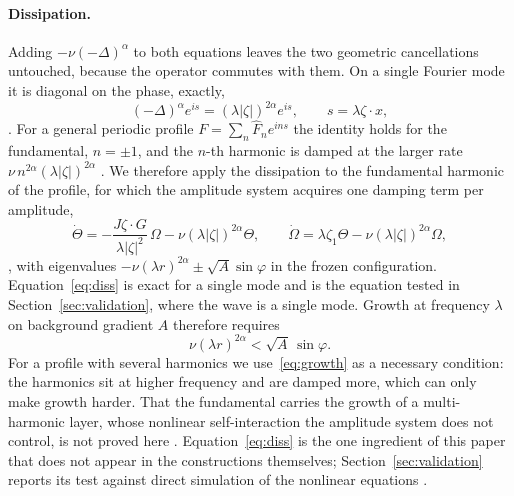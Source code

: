 \documentclass[11pt]{article}
\theoremstyle{remark}
\newcommand{\ev}[1]{\hspace{0.2em}{\small\textsf{[#1]}}}
\begin{document}
\paragraph{Dissipation.} Adding $-\nu(-\Delta)^{\alpha}$ to both equations leaves the two geometric
cancellations untouched, because the operator commutes with them. On a single Fourier mode it is
diagonal on the phase, exactly,
\begin{equation}\label{eq:mode}
(-\Delta)^{\alpha}e^{is}=(\lambda|\zeta|)^{2\alpha}e^{is},\qquad s=\lambda\zeta\cdot x ,
\end{equation}
\ev{D}. For a general periodic profile $F=\sum_{n}\hat F_{n}e^{ins}$ the identity holds for the
fundamental, $n=\pm1$, and the $n$-th harmonic is damped at the larger rate
$\nu\,n^{2\alpha}(\lambda|\zeta|)^{2\alpha}$ \ev{D}. We therefore apply the dissipation to the
fundamental harmonic of the profile, for which the amplitude system acquires one damping term per
amplitude,
\begin{equation}\label{eq:diss}
\dot\Theta=-\frac{J\zeta\cdot G}{\lambda|\zeta|^{2}}\,\Omega-\nu(\lambda|\zeta|)^{2\alpha}\Theta,
\qquad
\dot\Omega=\lambda\zeta_{1}\Theta-\nu(\lambda|\zeta|)^{2\alpha}\Omega ,
\end{equation}
\ev{D}, with eigenvalues $-\nu(\lambda r)^{2\alpha}\pm\sqrt A\sin\varphi$ in the frozen configuration.
Equation~\eqref{eq:diss} is exact for a single mode and is the equation tested in
Section~\ref{sec:validation}, where the wave is a single mode. Growth at frequency $\lambda$ on
background gradient $A$ therefore requires
\begin{equation}\label{eq:growth}
\nu(\lambda r)^{2\alpha}<\sqrt A\,\sin\varphi .
\end{equation}
For a profile with several harmonics we use~\eqref{eq:growth} as a necessary condition: the
harmonics sit at higher frequency and are damped more, which can only make growth harder. That the
fundamental carries the growth of a multi-harmonic layer, whose nonlinear self-interaction the
amplitude system does not control, is not proved here \ev{C}. Equation~\eqref{eq:diss} is the one
ingredient of this paper that does not appear in the constructions themselves;
Section~\ref{sec:validation} reports its test against direct simulation of the nonlinear equations
\ev{MV}.
\end{document}
